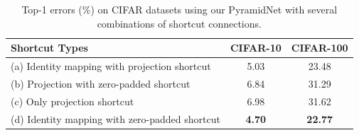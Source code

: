 \documentclass[10pt,twocolumn,letterpaper]{article}
\begin{document}

\begin{table}[t]
\footnotesize
\fontsize{7}{8}\selectfont
\begin{center}
\begin{tabular}{|l|c|c|}
\hline
Shortcut Types  & CIFAR-10 & CIFAR-100\\
\hline
(a) Identity mapping with projection shortcut & 5.03 & 23.48\\
(b) Projection with zero-padded shortcut & 6.84 & 31.29 \\
(c) Only projection shortcut & 6.98 & 31.62 \\
(d) Identity mapping with zero-padded shortcut & {\bf4.70}  & {\bf 22.77}\\
\hline
\end{tabular}
\end{center}
\caption{Top-1 errors (\%) on CIFAR datasets using our PyramidNet with several combinations of shortcut connections.}
\label{table:shortcut}
\end{table}
\end{document}
